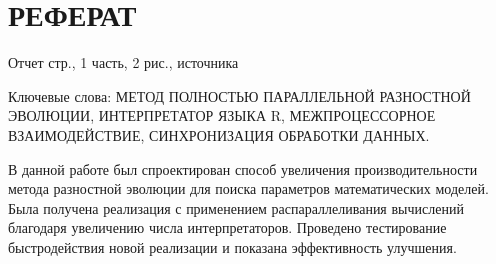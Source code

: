 \chapter*{РЕФЕРАТ}

Отчет \pageref{LastPage} стр., 1 часть, 2 рис.,  источника

Ключевые слова:
МЕТОД ПОЛНОСТЬЮ ПАРАЛЛЕЛЬНОЙ РАЗНОСТНОЙ ЭВОЛЮЦИИ,
ИНТЕРПРЕТАТОР ЯЗЫКА R,
МЕЖПРОЦЕССОРНОЕ ВЗАИМОДЕЙСТВИЕ,
СИНХРОНИЗАЦИЯ ОБРАБОТКИ ДАННЫХ.

В данной работе был спроектирован
способ увеличения производительности
метода разностной эволюции
для поиска параметров математических моделей.
Была получена реализация
с применением распараллеливания вычислений
благодаря увеличению числа интерпретаторов.
Проведено тестирование быстродействия
новой реализации и показана эффективность улучшения.

